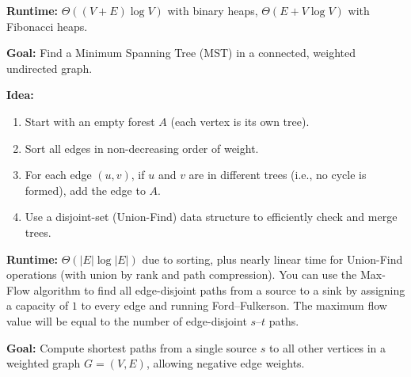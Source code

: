 \documentclass[a4paper,landscape]{article}
\begin{document}
\begin{multicols}{7}
\textbf{Runtime:} $\Theta((V + E) \log V)$ with binary heaps, $\Theta(E + V \log V)$ with Fibonacci heaps.
\endtcolorbox

\tcolorbox[mybox={Kruskal’s Algorithm}]
\textbf{Goal:} Find a Minimum Spanning Tree (MST) in a connected, weighted undirected graph.

\textbf{Idea:}
\begin{enumerate}[noitemsep, topsep=0pt]
    \item Start with an empty forest $A$ (each vertex is its own tree).
    \item Sort all edges in non-decreasing order of weight.
    \item For each edge $(u, v)$, if $u$ and $v$ are in different trees (i.e., no cycle is formed), add the edge to $A$.
    \item Use a disjoint-set (Union-Find) data structure to efficiently check and merge trees.
\end{enumerate}

\noindent %

\textbf{Runtime:} $\Theta(|E| \log |E|)$ due to sorting, plus nearly linear time for Union-Find operations (with union by rank and path compression).
\endtcolorbox
\tcolorbox[mybox={Edge Disjoint Paths using Max Flow}]
You can use the Max-Flow algorithm to find all edge-disjoint paths from a source to a sink by assigning a capacity of $1$ to every edge and running Ford–Fulkerson.  
The maximum flow value will be equal to the number of edge-disjoint $s$–$t$ paths.
\endtcolorbox


\tcolorbox[mybox={Bellman-Ford Algorithm}]
\textbf{Goal:} Compute shortest paths from a single source $s$ to all other vertices in a weighted graph $G = (V, E)$, allowing negative edge weights.


\end{multicols}
\end{document}
